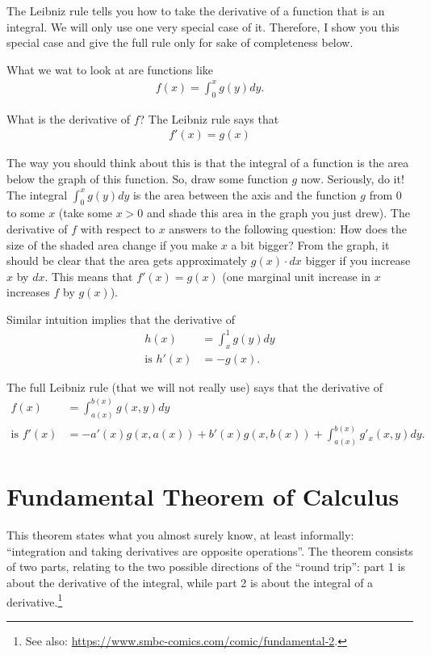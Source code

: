 \documentclass{article}
\begin{document}
The Leibniz rule tells you how to take the derivative of a function that is an integral. We will only use one very special case of it. Therefore, I show you this special case and give the full rule only for sake of completeness below.

What we wat to look at are functions like
\begin{align*}
	f(x) = \int_0^x g(y) dy.
\end{align*}

What is the derivative of $f$? The Leibniz rule says that
\begin{align*}
	f'(x)=g(x)
\end{align*}

The way you should think about this is that the integral of a function is the area below the graph of this function. So, draw some function $g$ now. Seriously, do it! The integral $\int_0^x g(y) dy$ is the area between the axis and the function $g$ from $0$ to some $x$ (take some $x > 0$ and shade this area in the graph you just drew). The derivative of $f$ with respect to $x$ answers to the following question: How does the size of the shaded area change if you make $x$ a bit bigger? From the graph, it should be clear that the area gets approximately $g(x) \cdot dx$ bigger if you increase $x$ by $dx$. This means that $f'(x) = g(x)$ (one marginal unit increase in $x$ increases $f$ by $g(x)$).

Similar intuition implies that the derivative of
\begin{align*}
	h(x) &= \int_x^1 g(y) dy
	\\
	\text{is }
	h'(x) &= -g(x).
\end{align*}

The full Leibniz rule (that we will not really use) says that the derivative of
\begin{align*}
	f(x) &= \int_{a(x)}^{b(x)} g(x,y) dy
	\\
	\text{is } f'(x) &= -a'(x)g(x,a(x)) + b'(x) g(x,b(x)) + \int_{a(x)}^{b(x)} g'_x(x,y) dy.
\end{align*}



\section{Fundamental Theorem of Calculus}

This theorem states what you almost surely know, at least informally: ``integration and taking derivatives are opposite operations''. The theorem consists of two parts, relating to the two possible directions of the ``round trip'': part 1 is about the derivative of the integral, while part 2 is about the integral of a derivative.\footnote{See also: \url{https://www.smbc-comics.com/comic/fundamental-2}.}
\end{document}
